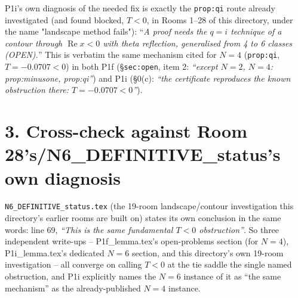 \documentclass[11pt]{article}
\begin{document}
P1i's own diagnosis of the needed fix is exactly the \texttt{prop:qi} route already investigated (and
found blocked, $T<0$, in Rooms 1--28 of this directory, under the name "landscape method fails"):
``\emph{A proof needs the $q=i$ technique of a contour through $\operatorname{Re}x<0$ with theta
reflection, generalised from 4 to 6 classes (OPEN).}'' This is verbatim the same mechanism cited for
$N=4$ (\texttt{prop:qi}, $T=-0.0707<0$) in both P1f (\S\texttt{sec:open}, item 2: \emph{``except
$N=2$, $N=4$: prop:minusone, prop:qi''}) and P1i (\S0(c): \emph{``the certificate reproduces the
known obstruction there: $T=-0.0707<0$''}).

\section*{3. Cross-check against Room 28's/N6\_DEFINITIVE\_status's own diagnosis}
\texttt{N6\_DEFINITIVE\_status.tex} (the 19-room landscape/contour investigation this directory's
earlier rooms are built on) states its own conclusion in the same words: line 69,
\emph{``This is the same fundamental $T<0$ obstruction''}. So three independent write-ups --
P1f\_lemma.tex's open-problems section (for $N=4$), P1i\_lemma.tex's dedicated $N=6$ section, and
this directory's own 19-room investigation -- all converge on calling $T<0$ at the tie saddle the
single named obstruction, and P1i explicitly names the $N=6$ instance of it as ``the same
mechanism'' as the already-published $N=4$ instance.
\end{document}
